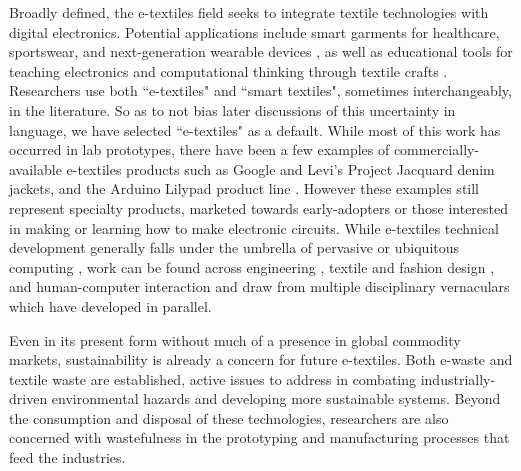 
Broadly defined, the e-textiles field seeks to integrate textile technologies with digital electronics. Potential applications include smart garments for healthcare, sportswear, and
next-generation wearable devices \cite{stoppa_wearable_2014},
as well as educational tools for teaching electronics and computational thinking through textile crafts \cite{kafai_ethnocomputing_2014, buechley_lilypad-edu_2008}. Researchers use both ``e-textiles" and ``smart textiles", sometimes interchangeably, in the literature. So as to not bias later discussions of this uncertainty in language, we have selected ``e-textiles" as a default.
While most of this work has occurred in lab prototypes, there have been a few examples of commercially-available e-textiles products such as Google and Levi's Project Jacquard denim jackets, and the Arduino Lilypad product line \cite{poupyrev_project_2016, buechley_lilypad_2008}
. However these examples still represent specialty products, marketed towards early-adopters or those interested in making or learning how to make electronic circuits.
While e-textiles technical development generally falls under the umbrella of pervasive or ubiquitous computing \cite{marculescu_electronic_2003}, work can be found across engineering \cite{liu_advances_2018, afroj_engineering_2019, lund_roll--roll_2018} %
, textile and fashion design \cite{mcquillan_hybrid_2019, fairburn_spheres_2016} %
, and human-computer interaction \cite{nachtigall_five-year_2018, posch_etextiles_2019} %
and draw from multiple disciplinary vernaculars which have developed in parallel. 

Even in its present form without much of a presence in global commodity markets, sustainability is already a concern for future e-textiles. Both e-waste \cite{robinson_e-waste:_2009,forti_global_2020} and textile waste \cite{sandin_environmental_2018,muthu_textiles_2017} are established, active issues to address in combating industrially-driven environmental hazards and developing more sustainable systems. Beyond the consumption and disposal of these technologies, researchers are also concerned with wastefulness in the prototyping \cite{dew_designing_2019, wall_scrappy_2021} %
and manufacturing \cite{machado_sustainable_2020, schoggl_narrative_2020}
processes that feed the industries. 

